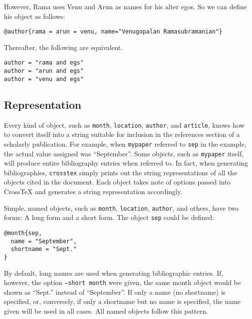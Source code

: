 \documentclass{article}
\newcommand{\XTX}{Cross\TeX}
\begin{document}
However, Rama uses Venu and Arun as names for his alter egos. So we can
define his object as follows:

\begin{small}\begin{verbatim}
@author{rama = arun = venu, name="Venugopalan Ramasubramanian"}
\end{verbatim}\end{small}

Thereafter, the following are equivalent.

\begin{small}\begin{verbatim}
author = "rama and egs"
author = "arun and egs"
author = "venu and egs"
\end{verbatim}\end{small}

\subsection{Representation}

Every kind of object, such as \texttt{month}, \texttt{location},
\texttt{author}, and \texttt{article}, knows how to convert itself into
a string suitable for inclusion in the references section of a scholarly
publication. For example, when \texttt{mypaper} referred to \texttt{sep}
in the example, the actual value assigned was ``September''. Some objects,
such as \texttt{mypaper} itself, will produce entire bibliography
entries when referred to. In fact, when generating bibliographies,
\texttt{crosstex} simply prints out the string representations of all
the objects cited in the document.  Each object takes note of options
passed into \XTX{} and generates a string representation accordingly.

Simple, named objects, such as \texttt{month}, \texttt{location},
\texttt{author}, and others, have two forms: A long form and a short
form. The object \texttt{sep} could be defined:

\begin{small}\begin{verbatim}
@month{sep,
  name = "September",
  shortname = "Sept."
}
\end{verbatim}\end{small}

By default, long names are used when generating bibliographic entries. If,
however, the option \texttt{--short month} were given, the same month
object would be shown as ``Sept.'' instead of ``September''. If only a
name (no shortname) is specified, or, conversely, if only a shortname
but no name is specified, the name given will be used in all cases. All
named objects follow this pattern.
\end{document}
